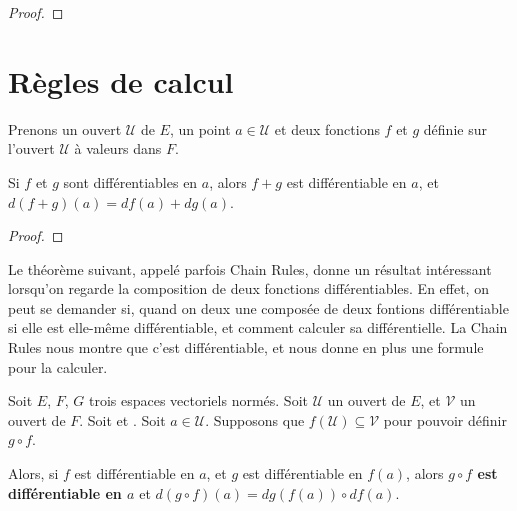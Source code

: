 \begin{proof}
	
\end{proof}

\section{Règles de calcul}


%

Prenons un ouvert $\mathcal{U}$ de $E$, un point $a \in \mathcal{U}$ et deux
fonctions $f$ et $g$ définie sur l'ouvert $\mathcal{U}$ à valeurs dans $F$.

\begin{proposition}
	Si $f$ et $g$ sont différentiables en $a$, alors $f + g$ est différentiable
	en $a$, et $d(f + g)(a) = df(a) + dg(a)$.
\end{proposition}

\begin{proof}
	
\end{proof}

Le théorème suivant, appelé parfois Chain Rules, donne un résultat intéressant
lorsqu'on regarde la composition de deux fonctions différentiables. En effet, on
peut se demander si, quand on deux une composée de deux fontions différentiable
si elle est elle-même différentiable, et comment calculer sa différentielle. La
Chain Rules nous montre que c'est différentiable, et nous donne en plus une
formule pour la calculer.

\begin{theorem}
	Soit $E$, $F$, $G$ trois espaces vectoriels normés.
	Soit $\mathcal{U}$ un ouvert de $E$, et $\mathcal{V}$ un ouvert de $F$.
	Soit  et
	.
	Soit $a \in \mathcal{U}$.
	Supposons que $f(\mathcal{U}) \subseteq \mathcal{V}$ pour pouvoir définir $g
	\circ f$.

	Alors, si $f$ est différentiable en $a$, et $g$ est différentiable en
	$f(a)$, alors \textbf{$g \circ f$ est différentiable en $a$} et
	$d(g \circ f)(a) = dg(f(a)) \circ df(a)$.
	\label{composition_differential}
\end{theorem}


